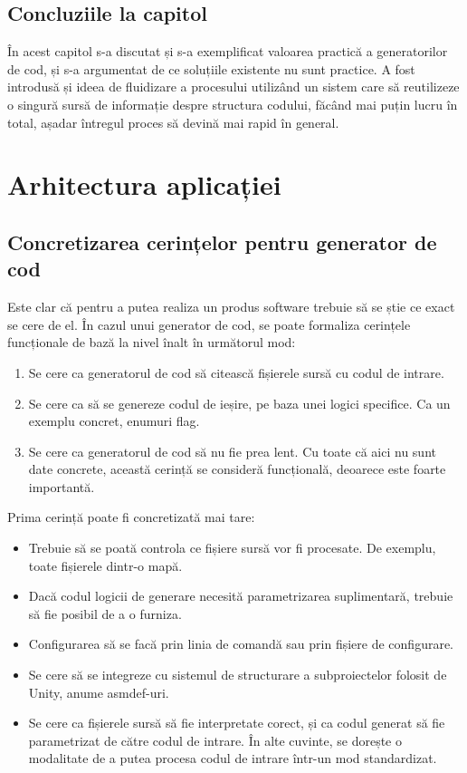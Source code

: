 \documentclass[a4paper,12pt]{report}
\def\oldchapter{} \let\oldchapter=\chapter{}
\def\chapter{\stepcounter{num_chapters}\oldchapter}
\newcommand\chapterConclusionSection[1]{\section{Concluziile la capitol \arabic{chapter}}}
\begin{document}
\chapterConclusionSection{intro_chapter_id}

În acest capitol s-a discutat și s-a exemplificat valoarea practică a generatorilor de cod, și s-a argumentat de ce soluțiile existente nu sunt practice.
A fost introdusă și ideea de fluidizare a procesului utilizând un sistem care să reutilizeze o singură sursă de informație despre structura codului, făcând mai puțin lucru în total, așadar întregul proces să devină mai rapid în general.

\chapter{Arhitectura aplicației}\label{architecture_chapter_id}

\section{Concretizarea cerințelor pentru generator de cod}

Este clar că pentru a putea realiza un produs software trebuie să se știe ce exact se cere de el.
În cazul unui generator de cod, se poate formaliza cerințele funcționale de bază la nivel înalt în următorul mod:

\begin{enumerate}
  \item Se cere ca generatorul de cod să citească fișierele sursă cu codul de intrare.
  \item Se cere ca să se genereze codul de ieșire, pe baza unei logici specifice. Ca un exemplu concret, enumuri flag.
  \item Se cere ca generatorul de cod să nu fie prea lent.
        Cu toate că aici nu sunt date concrete, această cerință se consideră funcțională, deoarece este foarte importantă.
\end{enumerate}

Prima cerință poate fi concretizată mai tare:

\begin{itemize}
  \item Trebuie să se poată controla ce fișiere sursă vor fi procesate. De exemplu, toate fișierele dintr-o mapă.
  \item Dacă codul logicii de generare necesită parametrizarea suplimentară, trebuie să fie posibil de a o furniza.
  \item Configurarea să se facă prin linia de comandă sau prin fișiere de configurare.
  \item Se cere să se integreze cu sistemul de structurare a subproiectelor folosit de Unity, anume asmdef-uri.
  \item Se cere ca fișierele sursă să fie interpretate corect, și ca codul generat să fie parametrizat de către codul de intrare. În alte cuvinte, se dorește o modalitate de a putea procesa codul de intrare într-un mod standardizat.
\end{itemize}
\end{document}
